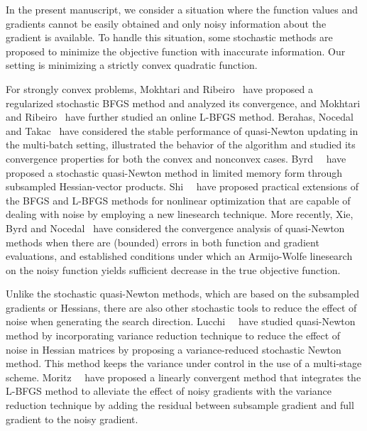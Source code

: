 \documentclass[11pt,twoside]{article}
\begin{document}



In the present manuscript, we consider a situation where the function
values and gradients cannot be easily obtained and only noisy
information about the gradient is available.  To handle this
situation, some stochastic methods are proposed to minimize the
objective function with inaccurate information. Our setting is
minimizing a strictly convex quadratic function.

For strongly convex problems, Mokhtari and Ribeiro~\cite{MR13} have
proposed a regularized stochastic BFGS method and analyzed its
convergence, and Mokhtari and Ribeiro~\cite{MR15} have further studied
an online L-BFGS method.  Berahas, Nocedal and Takac~\cite{BNT16} have
considered the stable performance of quasi-Newton updating in the
multi-batch setting, illustrated the behavior of the algorithm and
studied its convergence properties for both the convex and nonconvex
cases.  Byrd~\etal~\cite{BHNS16} have proposed a stochastic
quasi-Newton method in limited memory form through subsampled
Hessian-vector products.  Shi~\etal~\cite{shi2020noisetolerant}
have proposed practical extensions of the BFGS and L-BFGS methods for
nonlinear optimization that are capable of dealing with noise by
employing a new linesearch technique.  More recently, Xie, Byrd and
Nocedal~\cite{XBN20} have considered the convergence analysis of
quasi-Newton methods when there are (bounded) errors in both function
and gradient evaluations, and established conditions under which an
Armijo-Wolfe linesearch on the noisy function yields sufficient
decrease in the true objective function.

Unlike the stochastic quasi-Newton methods, which are based on the
subsampled gradients or Hessians, there are also other stochastic
tools to reduce the effect of noise when generating the search
direction. Lucchi~\etal~\cite{LMH15} have studied quasi-Newton method
by incorporating variance reduction technique to reduce the effect of
noise in Hessian matrices by proposing a variance-reduced stochastic
Newton method.  This method keeps the variance under control in the
use of a multi-stage scheme.  Moritz~\etal~\cite{MNJ16} have proposed a
linearly convergent method that integrates the L-BFGS method to
alleviate the effect of noisy gradients with the variance reduction
technique by adding the residual between subsample gradient and full
gradient to the noisy gradient.
\end{document}
